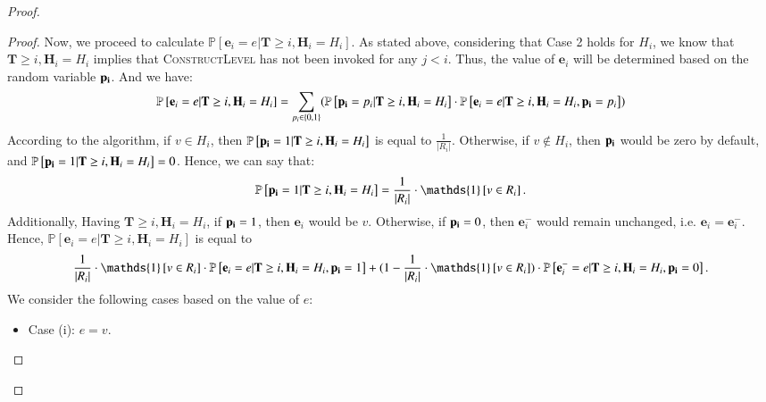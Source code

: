 \documentclass[11pt]{article}
\renewcommand{\Pr}[1]{\ensuremath{\mathbb{P}\left[#1\right]}}
\newcommand{\ind}[1]{\ensuremath{\mathds{1}\left[#1\right]}}
\newcommand{\constLevel}{\textsc{ConstructLevel}}
\newcommand{\bE}{\ensuremath{\mathbf{e}}}
\newcommand{\bT}{\ensuremath{\mathbf{T}}}
\newcommand{\bH}{\ensuremath{\mathbf{H}}}
\begin{document}
\begin{proof}
\begin{proof}
Now, we proceed to calculate $\Pr{\bE_i = e|\bT \geq i, \bH_i = H_i}$. 
As stated above, considering that Case 2 holds for $H_i$, we know that 
$\bT \geq i, \bH_i = H_i$ implies that \constLevel{} has not been invoked for any $j < i$. Thus, the value of $\bE_i$ will be determined based on the random variable $\bold{p_i}$. And we have: 
$$\Pr{\bE_i = e|\bT \geq i, \bH_i = H_i} = 
\sum_{p_i \in \{0, 1\}}
(\Pr{\bold{p_i} = p_i|\bT \geq i, \bH_i = H_i} \cdot
\Pr{\bE_i = e|\bT \geq i, \bH_i = H_i, \bold{p_i} = p_i}) $$
According to the algorithm, if $v \in H_i$, then $\Pr{\bold{p_i} = 1|\bT \geq i, \bH_i = H_i}$ is equal to $\frac{1}{|R_i|}$. Otherwise, if $v \notin H_i$, then $\bold{p_i}$ would be zero by default, and $\Pr{\bold{p_i} = 1|\bT \geq i, \bH_i = H_i} = 0$. Hence, we can say that: 
$$\Pr{\bold{p_i} = 1|\bT \geq i, \bH_i = H_i} = 
\frac{1}{|R_i|} \cdot \ind{v \in R_i}.$$
Additionally, Having $\bT \geq i, \bH_i = H_i$, 
 if $\bold{p_i} = 1$, then $\bE_i$ would be $v$. 
Otherwise, if $\bold{p_i} = 0$, then $\bE_i^-$ would remain unchanged, i.e. $\bE_i = \bE_i^-$.  
Hence, $\Pr{\bE_i = e|\bT \geq i, \bH_i = H_i}$ is equal to 
$$
\frac{1}{|R_i|} \cdot \ind{v \in R_i} \cdot
\Pr{\bE_i = e|\bT \geq i, \bH_i = H_i, \bold{p_i} = 1} 
+ (1 - \frac{1}{|R_i|} \cdot \ind{v \in R_i})\cdot
\Pr{\bE_i^- = e|\bT \geq i, \bH_i = H_i, \bold{p_i} = 0}
.$$
We consider the following cases based on the value of $e$: 
\begin{itemize}
\item Case (i): $e = v$.


\end{itemize}
\end{proof}
\end{proof}
\end{document}

